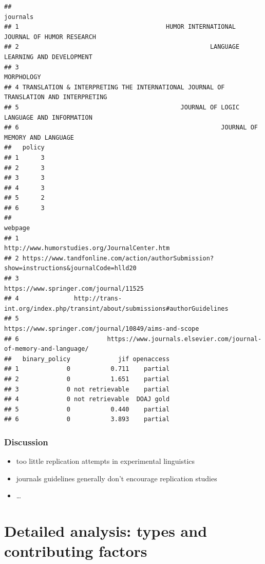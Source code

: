 \documentclass[]{elsarticle} %
\providecommand{\tightlist}{%
  \setlength{\itemsep}{0pt}\setlength{\parskip}{0pt}}
\begin{document}
\begin{verbatim}
##                                                                               journals
## 1                                        HUMOR INTERNATIONAL JOURNAL OF HUMOR RESEARCH
## 2                                                    LANGUAGE LEARNING AND DEVELOPMENT
## 3                                                                           MORPHOLOGY
## 4 TRANSLATION & INTERPRETING THE INTERNATIONAL JOURNAL OF TRANSLATION AND INTERPRETING
## 5                                            JOURNAL OF LOGIC LANGUAGE AND INFORMATION
## 6                                                       JOURNAL OF MEMORY AND LANGUAGE
##   policy
## 1      3
## 2      3
## 3      3
## 4      3
## 5      2
## 6      3
##                                                                                    webpage
## 1                                            http://www.humorstudies.org/JournalCenter.htm
## 2 https://www.tandfonline.com/action/authorSubmission?show=instructions&journalCode=hlld20
## 3                                                   https://www.springer.com/journal/11525
## 4               http://trans-int.org/index.php/transint/about/submissions#authorGuidelines
## 5                                    https://www.springer.com/journal/10849/aims-and-scope
## 6                        https://www.journals.elsevier.com/journal-of-memory-and-language/
##   binary_policy             jif openaccess
## 1             0           0.711    partial
## 2             0           1.651    partial
## 3             0 not retrievable    partial
## 4             0 not retrievable  DOAJ gold
## 5             0           0.440    partial
## 6             0           3.893    partial
\end{verbatim}

\hypertarget{discussion}{%
\subsubsection{Discussion}\label{discussion}}

\begin{itemize}
\tightlist
\item
  too little replication attempts in experimental linguistics
\item
  journals guidelines generally don't encourage replication studies
\item
  \ldots{}
\end{itemize}

\hypertarget{detailed-analysis-types-and-contributing-factors}{%
\section{Detailed analysis: types and contributing
factors}\label{detailed-analysis-types-and-contributing-factors}}
\end{document}
